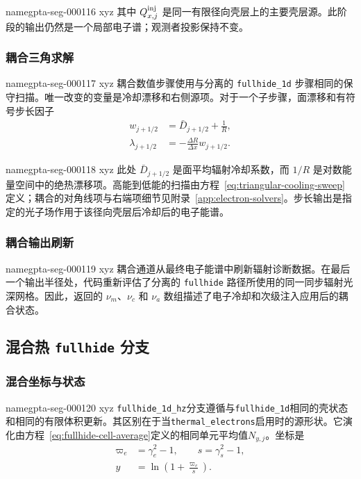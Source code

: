 \documentclass[twocolumn]{aastex702}
\makeatletter
\providecommand{\gptareaderanchor}[1]{\pdfdest name{#1} xyz}%
\providecommand{\gptareaderanchor}[1]{\special{pdf:dest (#1) [ @thispage /XYZ @xpos @ypos null ]}}%
\makeatother
\begin{document}
\gptareaderanchor{gpta-seg-000116}%
其中 \(Q_{x,j}^{\rm inj}\) 是同一有限径向壳层上的主要壳层源。此阶段的输出仍然是一个局部电子谱；观测者投影保持不变。

\subsubsection{耦合三角求解}


\gptareaderanchor{gpta-seg-000117}%
耦合数值步骤使用与分离的 \texttt{fullhide\_1d} 步骤相同的保守扫描。唯一改变的变量是冷却漂移和右侧源项。对于一个子步骤，面漂移和有符号步长因子
\begin{equation}
\begin{aligned}
w_{j+1/2}&=\bar D_{j+1/2}+\frac{1}{R},\\
\lambda_{j+1/2}&=-\frac{\Delta R}{\Delta x}w_{j+1/2}.
\end{aligned}
\end{equation}

\gptareaderanchor{gpta-seg-000118}%
此处 \(\bar D_{j+1/2}\) 是面平均辐射冷却系数，而 \(1/R\) 是对数能量空间中的绝热漂移项。高能到低能的扫描由方程~\eqref{eq:triangular-cooling-sweep} 定义；耦合的对角线项与右端项细节见附录~\ref{app:electron-solvers}。步长输出是指定的光子场作用于该径向壳层后冷却后的电子能谱。

\subsubsection{耦合输出刷新}


\gptareaderanchor{gpta-seg-000119}%
耦合通道从最终电子能谱中刷新辐射诊断数据。在最后一个输出半径处，代码重新评估了分离的 \texttt{fullhide} 路径所使用的同一同步辐射光深网格。因此，返回的 \(\nu_m\)、\(\nu_c\) 和 \(\nu_a\) 数组描述了电子冷却和次级注入应用后的耦合状态。

\subsection{混合热 \texttt{fullhide} 分支}

\subsubsection{混合坐标与状态}


\gptareaderanchor{gpta-seg-000120}%
\texttt{fullhide\_1d\_hz}分支遵循与\texttt{fullhide\_1d}相同的壳状态和相同的有限体积更新。其区别在于当\texttt{thermal\_electrons}启用时的源形状。它演化由方程~\eqref{eq:fullhide-cell-average}定义的相同单元平均值\(N_{y,j}\)。坐标是
\begin{equation}
\begin{aligned}
\varpi_e&=\gamma_e^2-1,\qquad s=\gamma_s^2-1,\\
y&=\ln\!\left(1+\frac{\varpi_e}{s}\right).
\end{aligned}
\end{equation}
\end{document}
